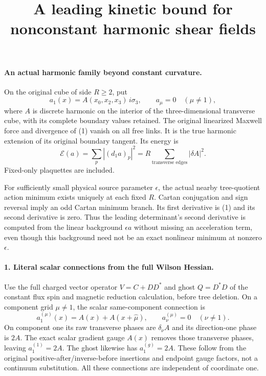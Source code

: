 \documentclass[11pt]{article}
\title{A leading kinetic bound for nonconstant harmonic shear fields}\author{}\date{}
\begin{document}
\maketitle
\paragraph{An actual harmonic family beyond constant curvature.}
On the original cube of side $R\ge2$, put
\[
 a_1(x)=A(x_0,x_2,x_3)\,i\sigma_3,\qquad a_\mu=0\quad(\mu\ne1),
                                                               \tag{1}
\]
where $A$ is discrete harmonic on the interior of the three-dimensional
transverse cube, with its complete boundary values retained.
The original linearized Maxwell force and divergence of (1) vanish
on all free links. It is the true harmonic extension of its original
boundary tangent. Its energy is
\[
 \mathcal E(a)=\sum_p |(d_1a)_p|^2
       =R\sum_{\text{transverse edges}}|\delta A|^2.              \tag{2}
\]
Fixed-only plaquettes are included.

For sufficiently small physical source parameter $\epsilon$, the actual
nearby tree-quotient action minimum exists uniquely at each fixed $R$.
Cartan conjugation and sign reversal imply an odd Cartan minimum branch.
Its first derivative is (1) and its second derivative is zero. Thus
the leading determinant's second derivative is computed from the
linear background $\epsilon a$ without missing an acceleration term,
even though this background need not be an exact nonlinear minimum
at nonzero $\epsilon$.

\paragraph{1. Literal scalar connections from the full Wilson Hessian.}
Use the full charged vector operator $V=C+DD^*$ and ghost $Q=D^*D$
of the constant flux spin and magnetic reduction calculation, before tree deletion. On a component grid $\mu\ne1$,
the scalar same-component connection is
\[
 a^{(\mu)}_1(x)=A(x)+A(x+\hat\mu),\qquad
 a^{(\mu)}_\nu=0\quad(\nu\ne1).
                                                               \tag{3}
\]
On component one its raw transverse phases are
$\delta_\nu A$ and its direction-one phase is $2A$.
The exact scalar gradient gauge $A(x)$ removes those transverse phases,
leaving $a^{(1)}_1=2A$. The ghost likewise has $a^{(g)}_1=2A$.
These follow from the original positive-after/inverse-before
insertions and endpoint gauge factors, not a continuum substitution.
All these connections are independent of coordinate one.
\end{document}
